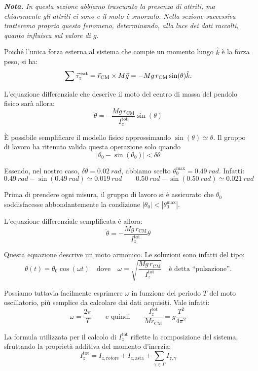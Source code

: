 \documentclass{article}
\begin{document}
\vspace{2mm}
\pagebreak
\emph{
  \textbf{Nota.} In questa sezione abbiamo trascurato la presenza di
  attriti, ma chiaramente gli attriti ci sono e il moto è smorzato.
  Nella sezione successiva tratteremo proprio questo fenomeno,
  determinando, alla luce dei dati raccolti, quanto influisca
  sul valore di $g$.
}
\vspace{2mm}

Poiché l'unica forza esterna al sistema che compie un momento lungo
$\hat{k}$ è la forza peso, si ha:
\[
  \sum\vec{\tau}^\text{\,ext}_z =
  \vec{r}_\text{CM}\times M\vec{g} = -Mg\,r_\text{CM}\sin(\theta)\hat{k}.
\]

L'equazione differenziale che descrive il moto del centro di massa
del pendolo fisico sarà allora:
\[ \ddot{\theta} = -\frac{Mg\,r_\text{CM}}{I_z^\text{tot}}\sin(\theta) \]

È possibile semplificare il modello fisico approssimando
$\sin(\theta)\simeq\theta$. Il gruppo di lavoro ha ritenuto
valida questa operazione solo quando
\[\left|\theta_0-\sin(\theta_0)\right| < \delta\theta\]

Essendo, nel nostro caso, $\delta\theta=\qty{0.02}{rad}$, abbiamo scelto
$\theta_0^\text{max} = \qty{0.49}{rad}$. Infatti:
\[
  \qty{0.49}{rad} - \sin(\qty{0.49}{rad}) \simeq \qty{0.019}{rad}
  \qquad
  \qty{0.50}{rad} - \sin(\qty{0.50}{rad}) \simeq \qty{0.021}{rad}
\]

Prima di prendere ogni misura, il gruppo di lavoro si è assicurato
che $\theta_0$ soddisfacesse abbondantemente la condizione
$|\theta_0|<\left|\theta_0^\text{max}\right|$.

L'equazione differenziale semplificata è allora:
\[ \ddot{\theta} = -\frac{Mg\,r_\text{CM}}{I_z^\text{tot}} \theta \]

Questa equazione descrive un moto armonico. Le soluzioni sono infatti
del tipo:
\[
  \theta(t) = \theta_0\cos(\omega t)
  \quad\text{dove}\quad
  \omega = \sqrt{\frac{Mg\,r_\text{CM}}{I_z^\text{tot}}}\quad\text{è detta “pulsazione”}.
\]

Possiamo tuttavia facilmente esprimere $\omega$ in funzione del periodo
$T$ del moto oscillatorio, più semplice da calcolare dai dati acquisiti.
Vale infatti:
\[
  \omega = \frac{2\pi}{T}
  \qquad\text{e quindi}\qquad
  \frac{I_z^\text{tot}}{Mr_\text{CM}} = g \frac{T^2}{4\pi^2}
\]

La formula utilizzata per il calcolo di $I_z^\text{tot}$ riflette la composizione
del sistema, sfruttando la proprietà additiva del momento d'inerzia:
\[I_z^\text{tot} = I_{z,\text{rotore}} + I_{z,\text{asta}} + \sum_{\gamma\in\Gamma} I_{z,\gamma}\]
\end{document}
